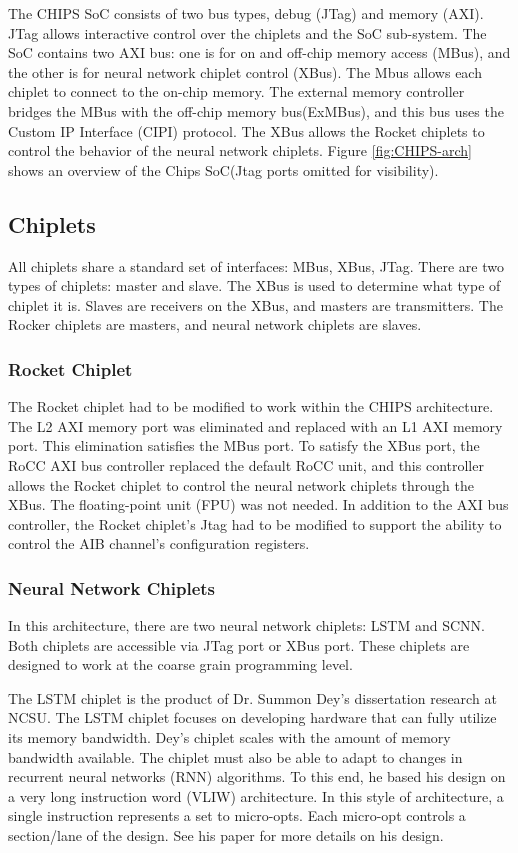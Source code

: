 \documentclass[../main.tex]{subfiles}
\begin{document}
The CHIPS SoC consists of two bus types, debug (JTag) and memory (AXI). JTag allows interactive control over the chiplets and the SoC sub-system. The SoC contains two AXI bus: one is for on and off-chip memory access (MBus), and the other is for neural network chiplet control (XBus).  The Mbus allows each chiplet to connect to the on-chip memory. The external memory controller bridges the MBus with the off-chip memory bus(ExMBus), and this bus uses the Custom IP Interface (CIPI) protocol. The XBus allows the Rocket chiplets to control the behavior of the neural network chiplets. Figure \ref{fig:CHIPS-arch} shows an overview of the Chips SoC(Jtag ports omitted for visibility).


\subsection{Chiplets}
All chiplets share a standard set of interfaces: MBus, XBus, JTag. There are two types of chiplets: master and slave. The XBus is used to determine what type of chiplet it is. Slaves are receivers on the XBus, and masters are transmitters. The Rocker chiplets are masters, and neural network chiplets are slaves.

\subsubsection{Rocket Chiplet}
The Rocket chiplet had to be modified to work within the CHIPS architecture. The L2 AXI memory port was eliminated and replaced with an L1 AXI memory port. This elimination satisfies the MBus port. To satisfy the XBus port, the RoCC AXI bus controller replaced the default RoCC unit, and this controller allows the Rocket chiplet to control the neural network chiplets through the XBus. The floating-point unit (FPU) was not needed. In addition to the AXI bus controller, the Rocket chiplet's Jtag had to be modified to support the ability to control the AIB channel's configuration registers.

\subsubsection{Neural Network Chiplets}
In this architecture, there are two neural network chiplets: LSTM and SCNN. Both chiplets are accessible via JTag port or XBus port. These chiplets are designed to work at the coarse grain programming level. 

The LSTM chiplet is the product of Dr. Summon Dey's dissertation research at NCSU\cite{Summon-Dey-LSTM}. The LSTM chiplet focuses on developing hardware that can fully utilize its memory bandwidth. Dey's chiplet scales with the amount of memory bandwidth available. The chiplet must also be able to adapt to changes in recurrent neural networks (RNN) algorithms. To this end, he based his design on a very long instruction word (VLIW) architecture. In this style of architecture, a single instruction represents a set to micro-opts. Each micro-opt controls a section/lane of the design. See his paper for more details on his design\cite{Summon-Dey-LSTM}.
\end{document}
